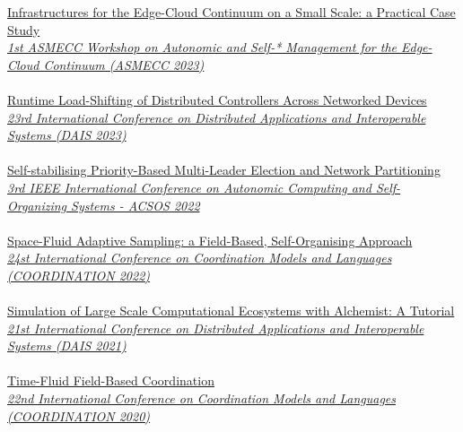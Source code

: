 \href{https://danysk.github.io/slides-2023-asmecc/}{Infrastructures for the Edge-Cloud Continuum on a Small Scale: a Practical Case Study} \\
\href{https://asmecc-workshop.github.io/2023/}{\textit{1st ASMECC Workshop on Autonomic and Self-* Management for the Edge-Cloud Continuum (ASMECC 2023)}}
\\ \halfblankline \\
\href{https://danysk.github.io/slides-2023-dais-loadshift/}{Runtime Load-Shifting of Distributed Controllers Across Networked Devices} \\
\href{https://www.discotec.org/2023/dais.html}{\textit{23rd International Conference on Distributed Applications and Interoperable Systems (DAIS 2023)}}
\\ \halfblankline \\
\href{https://danysk.github.io/Slides-2022-ACSOS-BoundedElection/}{Self-stabilising Priority-Based Multi-Leader Election and Network Partitioning} \\
\href{https://2022.acsos.org/}{\textit{3rd IEEE International Conference on Autonomic Computing and Self-Organizing Systems - ACSOS 2022}}
\\ \halfblankline \\
\href{https://danysk.github.io/Slides-2022-Coordination-SpaceFluid/}{Space-Fluid Adaptive Sampling: a Field-Based, Self-Organising Approach} \\
\href{https://danysk.github.io/Slides-2022-Coordination-SpaceFluid/}{\textit{24st International Conference on Coordination Models and Languages (COORDINATION 2022)}}
\\ \halfblankline \\
\href{https://alchemistsimulator.github.io/tutorials/basics/index.html}{Simulation of Large Scale Computational Ecosystems with Alchemist: A Tutorial} \\
\href{https://www.discotec.org/2023/dais.html}{\textit{21st International Conference on Distributed Applications and Interoperable Systems (DAIS 2021)}}
\\ \halfblankline \\
\href{https://danysk.github.io/Slides-2020-Coordination-TimeFluid/}{Time-Fluid Field-Based Coordination} \\
\href{http://www.discotec.org/2020/coordination.html}{\textit{22nd International Conference on Coordination Models and Languages (COORDINATION 2020)}}
\\ \halfblankline \\
